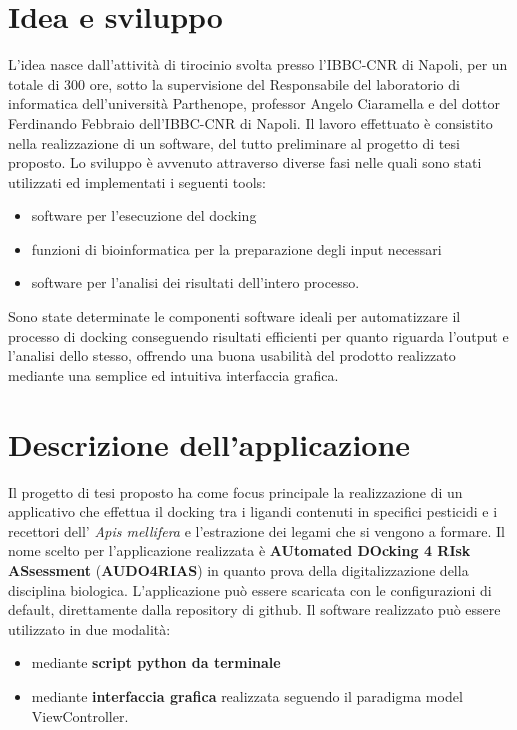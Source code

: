 \section{Idea e sviluppo}
L’idea nasce dall’attività di tirocinio svolta presso l’IBBC-CNR di Napoli, per un totale di 300 ore, sotto la supervisione del Responsabile del laboratorio di informatica dell’università Parthenope, professor Angelo Ciaramella e del dottor Ferdinando Febbraio dell’IBBC-CNR di Napoli. Il lavoro effettuato è consistito nella realizzazione di un software, del tutto preliminare al progetto di tesi proposto. Lo sviluppo è avvenuto attraverso diverse fasi nelle quali sono stati utilizzati ed implementati i seguenti tools: 

\begin{itemize}
    \item software per l'esecuzione del docking
    \item funzioni di bioinformatica per la preparazione degli input necessari
    \item software per l'analisi dei risultati dell'intero processo.
\end{itemize}

Sono state determinate le componenti software ideali per automatizzare il processo di docking conseguendo risultati efficienti per quanto riguarda l'output e l'analisi dello stesso, offrendo una buona usabilità del prodotto realizzato mediante una semplice ed intuitiva interfaccia grafica.

\section{Descrizione dell'applicazione}
Il progetto di tesi proposto ha come focus principale la realizzazione di un applicativo che effettua il docking tra i ligandi contenuti in specifici pesticidi e i recettori dell’ \textit{Apis mellifera} e l’estrazione dei legami che si vengono a 
formare.\newline
Il nome scelto per l'applicazione realizzata è \textbf{AUtomated DOcking 4 RIsk ASsessment} (\textbf{AUDO4RIAS}) in quanto prova della digitalizzazione della disciplina biologica.\newline
L’applicazione può essere scaricata con le configurazioni di default, direttamente dalla repository di github. Il software realizzato può essere utilizzato in due modalità: 

\begin{itemize}
    \item mediante \textbf{script python da terminale}
    \item mediante \textbf{interfaccia grafica} realizzata seguendo il paradigma model ViewController.
\end{itemize} 

